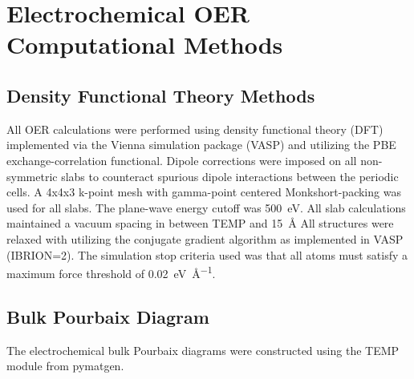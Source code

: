 

\section{Electrochemical OER Computational Methods}  %
%


\subsection{Density Functional Theory Methods}  %
%
%
All OER calculations were performed using density functional theory (DFT) implemented via the Vienna  simulation package (VASP)
\cite{Kresse1995,Kresse1996_0,Kresse1996_1}
and utilizing the PBE exchange-correlation functional\cite{Perdew1996}.
%
Dipole corrections were imposed on all non-symmetric slabs to counteract spurious dipole interactions between the periodic cells.\cite{Neugebauer1992}
%
A 4x4x3 k-point mesh with gamma-point centered Monkshort-packing\cite{Monkhorst1976} was used for all slabs.
%
The plane-wave energy cutoff was \SI{500}{\electronvolt}.
%
All slab calculations maintained a vacuum spacing in between TEMP and \SI{15}{\angstrom}
%
All structures were relaxed with utilizing the conjugate gradient algorithm as implemented in VASP (IBRION\num{=2}).
%
The simulation stop criteria used was that all atoms must satisfy a maximum force threshold of \SI{0.02}{\electronvolt\per\angstrom}.


\subsection{Bulk Pourbaix Diagram}  %
%
The electrochemical bulk Pourbaix diagrams were constructed using the TEMP module from pymatgen.

